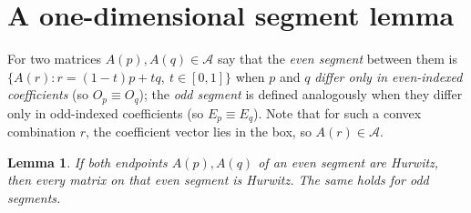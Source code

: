 \documentclass[12pt]{article}
\newtheorem{lemma}{Lemma}
\theoremstyle{definition}
\begin{document}
\section{A one-dimensional segment lemma}

For two matrices $A(p),A(q)\in\mathcal A$ say that the \emph{even segment} between them is
$\{A(r):r=(1-t)p+tq,\ t\in[0,1]\}$ when $p$ and $q$ \emph{differ only in even-indexed
coefficients} (so $O_p\equiv O_q$); the \emph{odd segment} is defined analogously when
they differ only in odd-indexed coefficients (so $E_p\equiv E_q$). Note that for such a
convex combination $r$, the coefficient vector lies in the box, so $A(r)\in\mathcal A$.

\begin{lemma}\label{lem:seg}
If both endpoints $A(p),A(q)$ of an even segment are Hurwitz, then every matrix on that
even segment is Hurwitz. The same holds for odd segments.
\end{lemma}
\end{document}

